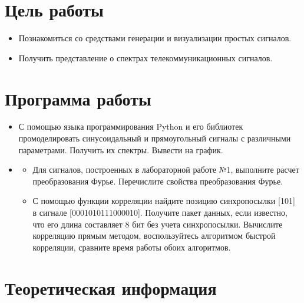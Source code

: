 
\usepackage{minted}




\setcounter{page}{2}



\section{Цель работы}
\begin{itemize}
	\item Познакомиться со средствами генерации и визуализации простых сигналов.
	\item Получить представление о спектрах телекоммуникационных сигналов.
\end{itemize}

\section{Программа работы}
\begin{itemize}
	\item С помощью языка программирования Python и его библиотек
	промоделировать синусоидальный и прямоугольный сигналы с различными параметрами. Получить их спектры. Вывести на график.
	\item \begin{itemize}
		\item Для сигналов, построенных в лабораторной работе №1, выполните расчет преобразования Фурье. Перечислите свойства преобразования Фурье.
		\item С помощью функции корреляции найдите позицию синхропосылки [101] в сигнале [0001010111000010]. Получите пакет данных, если известно, что его длина составляет 8 бит без учета синхропосылки. Вычислите корреляцию прямым методом, воспользуйтесь алгоритмом быстрой корреляции, сравните время работы обоих алгоритмов.
	\end{itemize}
\end{itemize}

\section{Теоретическая информация}
